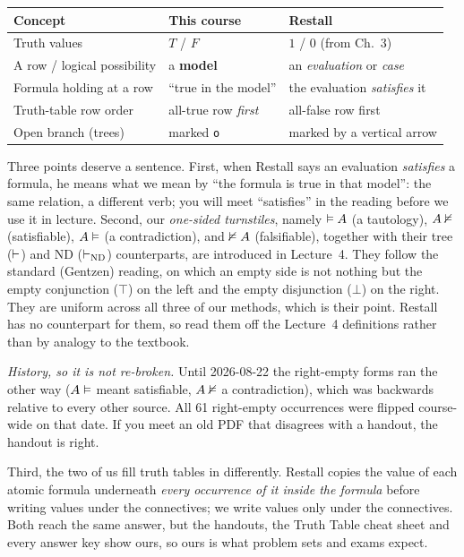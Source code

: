 \documentclass[11pt]{article}
\begin{document}
\begin{center}
\begin{tabular}{@{}lll@{}}
\toprule
Concept & This course & Restall \\
\midrule
Truth values             & $T$ / $F$                 & $1$ / $0$ (from Ch.~3) \\
A row / logical possibility & a \textbf{model}       & an \emph{evaluation} or \emph{case} \\
Formula holding at a row & ``true in the model''      & the evaluation \emph{satisfies} it \\
Truth-table row order    & all-true row \emph{first}  & all-false row first \\
Open branch (trees)      & marked \texttt{o}          & marked by a vertical arrow \\
\bottomrule
\end{tabular}
\end{center}

\noindent
Three points deserve a sentence. First, when Restall says an evaluation \emph{satisfies} a formula, he means what we mean by ``the formula is true in that model'': the same relation, a different verb; you will meet ``satisfies'' in the reading before we use it in lecture. Second, our \emph{one-sided turnstiles}, namely $\vDash A$ (a tautology), $A \nvDash$ (satisfiable), $A \vDash$ (a contradiction), and $\nvDash A$ (falsifiable), together with their tree ($\vdash$) and ND ($\vdash_{\mathrm{ND}}$) counterparts, are introduced in Lecture~4. They follow the standard (Gentzen) reading, on which an empty side is not nothing but the empty conjunction ($\top$) on the left and the empty disjunction ($\bot$) on the right. They are uniform across all three of our methods, which is their point. Restall has no counterpart for them, so read them off the Lecture~4 definitions rather than by analogy to the textbook.

\emph{History, so it is not re-broken.} Until 2026-08-22 the right-empty forms ran the other way ($A \vDash$ meant satisfiable, $A \nvDash$ a contradiction), which was backwards relative to every other source. All 61 right-empty occurrences were flipped course-wide on that date. If you meet an old PDF that disagrees with a handout, the handout is right.

Third, the two of us fill truth tables in differently. Restall copies the value of each atomic formula underneath \emph{every occurrence of it inside the formula} before writing values under the connectives; we write values only under the connectives. Both reach the same answer, but the handouts, the Truth Table cheat sheet and every answer key show ours, so ours is what problem sets and exams expect.
\end{document}
